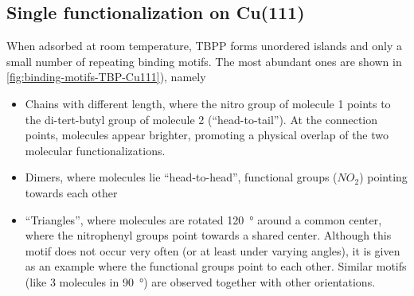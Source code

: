	\subsection{Single functionalization on Cu(111)}
	\label{sec:single-TBP-Cu111}
	When adsorbed at room temperature, TBPP forms unordered islands and only a small number of repeating binding motifs. The most abundant ones are shown in \autoref{fig:binding-motifs-TBP-Cu111}), namely
	\begin{itemize}
		\item Chains with different length, where the nitro group of molecule 1 points to the di-tert-butyl group of molecule 2 (``head-to-tail''). At the connection points, molecules appear brighter, promoting a physical overlap of the two molecular functionalizations.
		\item Dimers, where molecules lie ``head-to-head'', functional groups ($NO_2$) pointing towards each other
		\item ``Triangles'', where molecules are rotated \SI{120}{\degree} around a common center, where the nitrophenyl groups point towards a shared center. Although this motif does not occur very often (or at least under varying angles), it is given as an example where the functional groups point to each other. Similar motifs (like 3 molecules in \SI{90}{\degree}) are observed together with other orientations. 
	\end{itemize}
	


